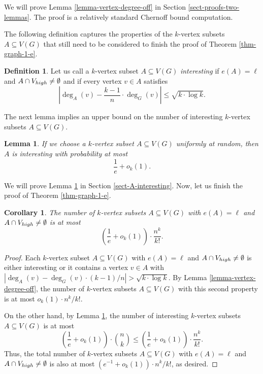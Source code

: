 \documentclass[11pt]{article}
\newtheorem{lemma}[theorem]{Lemma}
\newtheorem{corollary}[theorem]{Corollary}
\theoremstyle{definition}
\newtheorem{definition}[theorem]{Definition}
\numberwithin{equation}{section}
\begin{document}
We will prove Lemma \ref{lemma-vertex-degree-off} in Section \ref{sect-proofs-two-lemmas}. The proof is a relatively standard Chernoff bound computation.

The following definition captures the properties of the $k$-vertex subsets $A\subseteq V(G)$ that still need to be considered to finish the proof of Theorem \ref{thm-graph-1-e}.

\begin{definition}Let us call a $k$-vertex subset $A\subseteq V(G)$ \emph{interesting} if $e(A)=\ell$ and $A\cap V_{\textnormal{high}}\neq \emptyset$ and if every vertex $v\in A$ satisfies
\[\left\vert\deg_A(v)-\frac{k-1}{n}\cdot \deg_G(v)\right\vert\leq \sqrt{k\cdot \log k}.\]
\end{definition}

The next lemma implies an upper bound on the number of interesting $k$-vertex subsets $A\subseteq V(G)$.

\begin{lemma}\label{lemma-A-interesting}If we choose a $k$-vertex subset $A\subseteq V(G)$ uniformly at random, then $A$ is interesting with probability at most
\[\frac{1}{e}+o_k(1).\]
\end{lemma}

We will prove Lemma \ref{lemma-A-interesting} in Section \ref{sect-A-interesting}. Now, let us finish the proof of Theorem \ref{thm-graph-1-e}.

\begin{corollary}\label{coro-Vh}The number of $k$-vertex subsets $A\subseteq V(G)$ with $e(A)=\ell$ and $A\cap V_{\textnormal{high}}\neq \emptyset$ is at most
\[\left(\frac{1}{e}+o_k(1)\right)\cdot \frac{n^k}{k!}.\]
\end{corollary}
\begin{proof}Each $k$-vertex subset $A\subseteq V(G)$ with $e(A)=\ell$ and $A\cap V_{\textnormal{high}}\neq \emptyset$ is either interesting or it contains a vertex $v\in A$ with $\left\vert\deg_A(v)-\deg_G(v)\cdot (k-1)/n\right\vert>\sqrt{k\cdot \log k}$. By Lemma \ref{lemma-vertex-degree-off}, the number of  $k$-vertex subsets $A\subseteq V(G)$ with this second property is at most $o_k(1)\cdot n^k/k!$.

On the other hand, by Lemma \ref{lemma-A-interesting}, the number of interesting $k$-vertex subsets $A\subseteq V(G)$ is at most
\[\left(\frac{1}{e}+o_k(1)\right)\cdot {n\choose k}\leq \left(\frac{1}{e}+o_k(1)\right)\cdot \frac{n^k}{k!}.\]
Thus, the total number of $k$-vertex subsets $A\subseteq V(G)$ with $e(A)=\ell$ and $A\cap V_{\textnormal{high}}\neq \emptyset$ is also at most $(e^{-1}+o_k(1))\cdot n^k/k!$, as desired.
\end{proof}
\end{document}
